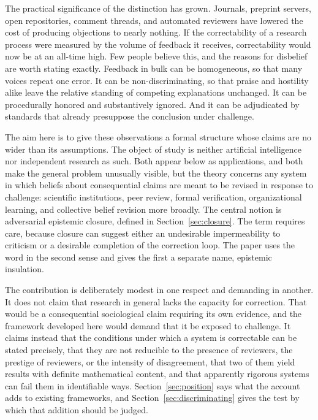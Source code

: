 \documentclass[11pt]{article}
\theoremstyle{remark}
\begin{document}
The practical significance of the distinction has grown. Journals, preprint servers, open repositories, comment threads, and automated reviewers have lowered the cost of producing objections to nearly nothing. If the correctability of a research process were measured by the volume of feedback it receives, correctability would now be at an all-time high. Few people believe this, and the reasons for disbelief are worth stating exactly. Feedback in bulk can be homogeneous, so that many voices repeat one error. It can be non-discriminating, so that praise and hostility alike leave the relative standing of competing explanations unchanged. It can be procedurally honored and substantively ignored. And it can be adjudicated by standards that already presuppose the conclusion under challenge.

The aim here is to give these observations a formal structure whose claims are no wider than its assumptions. The object of study is neither artificial intelligence nor independent research as such. Both appear below as applications, and both make the general problem unusually visible, but the theory concerns any system in which beliefs about consequential claims are meant to be revised in response to challenge: scientific institutions, peer review, formal verification, organizational learning, and collective belief revision more broadly. The central notion is adversarial epistemic closure, defined in Section~\ref{sec:closure}. The term requires care, because closure can suggest either an undesirable impermeability to criticism or a desirable completion of the correction loop. The paper uses the word in the second sense and gives the first a separate name, epistemic insulation.

The contribution is deliberately modest in one respect and demanding in another. It does not claim that research in general lacks the capacity for correction. That would be a consequential sociological claim requiring its own evidence, and the framework developed here would demand that it be exposed to challenge. It claims instead that the conditions under which a system is correctable can be stated precisely, that they are not reducible to the presence of reviewers, the prestige of reviewers, or the intensity of disagreement, that two of them yield results with definite mathematical content, and that apparently rigorous systems can fail them in identifiable ways. Section~\ref{sec:position} says what the account adds to existing frameworks, and Section~\ref{sec:discriminating} gives the test by which that addition should be judged.
\end{document}
